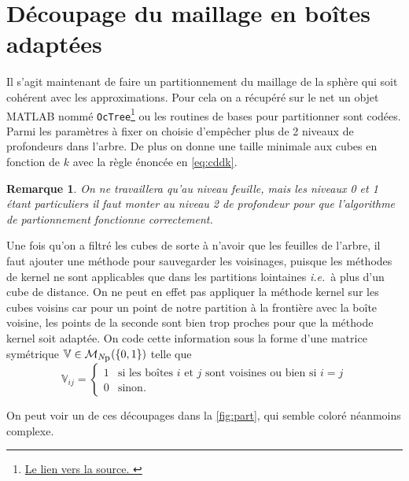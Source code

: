 \documentclass[11pt]{article}
\newtheorem{rmq}{Remarque}
\newcommand{\smbox}[1]{\mbox{\footnotesize #1}}
\newcommand{\ie}{\emph{i.e.}~}
\begin{document}
\section{Découpage du maillage en boîtes adaptées}

Il s'agit maintenant de faire un partitionnement du maillage de la sphère qui soit cohérent avec les approximations. Pour cela on a récupéré
sur le net un objet MATLAB nommé
\texttt{OcTree}\footnote{\href{https://fr.mathworks.com/matlabcentral/fileexchange/40732-octree-partitioning-3d-points-into-spatial-subvolumes}{Le
  lien vers la source. }}
ou les routines de bases pour partitionner sont codées. Parmi les paramètres à fixer on choisie d'empêcher plus de 2 niveaux de profondeurs
dans l'arbre. De plus on donne une taille minimale aux cubes en fonction de $k$ avec la règle énoncée en \autoref{eq:cddk}. 
\begin{rmq}
  On ne travaillera qu'au niveau feuille, mais les niveaux 0 et 1 étant particuliers il faut monter au niveau 2 de profondeur
  pour que l'algorithme de partionnement fonctionne correctement.
\end{rmq}

Une fois qu'on a filtré les cubes de sorte à n'avoir que les feuilles de l'arbre, il faut ajouter une méthode pour sauvegarder les
voisinages, puisque les méthodes de kernel ne sont applicables que dans les partitions lointaines \ie à plus d'un cube de distance.
On ne peut en effet pas appliquer la méthode kernel sur les cubes voisins car pour un point de notre partition à la frontière avec
la boîte voisine, les points de la seconde sont bien trop proches pour que la méthode kernel soit adaptée. On code cette information sous la
forme d'une matrice symétrique $\mathbb{V} \in \mathcal{M}_{N_{\smbox{p}}}(\{0,1\})$ telle que
\[
  \mathbb{V}_{ij} =
  \begin{cases}
    1 &  \text{si les boîtes $i$ et $j$ sont voisines ou bien si } i=j \\
    0 & \text{sinon}.
  \end{cases}
\]

On peut voir un de ces découpages dans la \autoref{fig:part}, qui semble coloré néanmoins complexe. 
\end{document}
